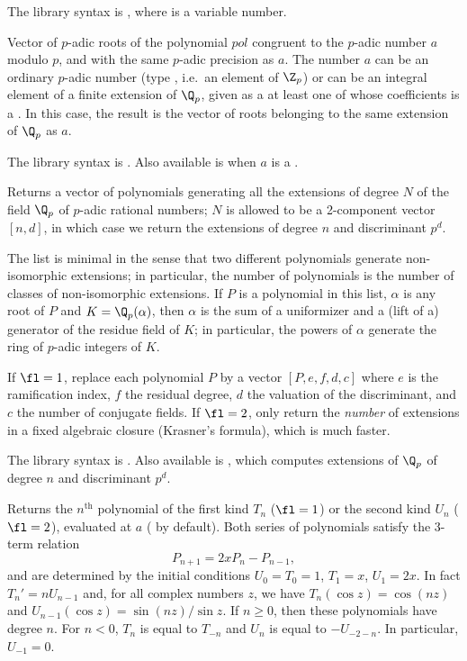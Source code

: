 The library syntax is , where  is a variable number.

\label{se:padicappr}
Vector of $p$-adic roots of the
polynomial $pol$ congruent to the $p$-adic number $a$ modulo $p$, and with
the same $p$-adic precision as $a$. The number $a$ can be an ordinary
$p$-adic number (type , i.e.~an element of $\Z_p$) or can be an
integral element of a finite extension of $\Q_p$, given as a 
at least one of whose coefficients is a . In this case, the result
is the vector of roots belonging to the same extension of $\Q_p$ as $a$.

The library syntax is .
Also available is  when $a$ is a
.

\label{se:padicfields}
Returns a vector of polynomials generating all the extensions of degree
$N$ of the field $\Q_p$ of $p$-adic rational numbers; $N$ is
allowed to be a 2-component vector $[n,d]$, in which case we return the
extensions of degree $n$ and discriminant $p^d$.

The list is minimal in the sense that two different polynomials generate
non-isomorphic extensions; in particular, the number of polynomials is the
number of classes of non-isomorphic extensions. If $P$ is a polynomial in this
list, $\alpha$ is any root of $P$ and $K = \Q_p(\alpha)$, then $\alpha$
is the sum of a uniformizer and a (lift of a) generator of the residue field
of $K$; in particular, the powers of $\alpha$ generate the ring of $p$-adic
integers of $K$.

If $\fl = 1$, replace each polynomial $P$ by a vector $[P, e, f, d, c]$
where $e$ is the ramification index, $f$ the residual degree, $d$ the
valuation of the discriminant, and $c$ the number of conjugate fields.
If $\fl = 2$, only return the \emph{number} of extensions in a fixed
algebraic closure (Krasner's formula), which is much faster.

The library syntax is .
Also available is
, which computes
extensions of $\Q_p$ of degree $n$ and discriminant $p^d$.

\label{se:polchebyshev}
Returns the $n^{\text{th}}$
 polynomial of the first kind $T_n$ ($\fl=1$) or the second
kind $U_n$ ($\fl=2$), evaluated at $a$ ( by default). Both series of
polynomials satisfy the 3-term relation
$$ P_{n+1} = 2xP_n - P_{n-1}, $$
and are determined by the initial conditions $U_0 = T_0 = 1$, $T_1 = x$,
$U_1 = 2x$. In fact $T_n' = n U_{n-1}$ and, for all complex numbers $z$, we
have $T_n(\cos z) = \cos (nz)$ and $U_{n-1}(\cos z) = \sin(nz)/\sin z$.
If $n \geq 0$, then these polynomials have degree $n$.  For $n < 0$,
$T_n$ is equal to $T_{-n}$ and $U_n$ is equal to $-U_{-2-n}$.
In particular, $U_{-1} = 0$.

